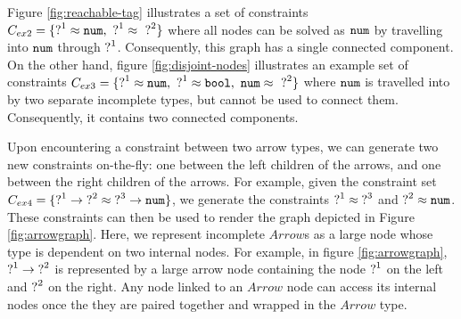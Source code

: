 Figure \ref{fig:reachable-tag} illustrates a set of constraints $C_{ex2} = \{ \mathtt{?}^{1} \approx \mathtt{num}, ~ \mathtt{?}^{1} \approx~ \mathtt{?}^{2}\}$ where all nodes can be solved as $\mathtt{num}$ by travelling into $\mathtt{num}$ through $\mathtt{?}^1$. Consequently, this graph has a single connected component. On the other hand, figure  \ref{fig:disjoint-nodes} illustrates an example set of constraints $C_{ex3} = \{ \mathtt{?}^1 \approx \mathtt{num}, ~ \mathtt{?}^1 \approx \mathtt{bool}, ~ \mathtt{num} \approx~ \mathtt{?}^2\}$ where $\mathtt{num}$ is travelled into by two separate incomplete types, but cannot be used to connect them. Consequently, it contains two connected components.


Upon encountering a constraint between two arrow types, we can generate two new constraints on-the-fly: one between the left children of the arrows, and one between the right children of the arrows. For example, given the constraint set $C_{ex4} = \{ \mathtt{?}^1 \rightarrow \mathtt{?}^2 \approx \mathtt{?}^3 \rightarrow \mathtt{num} \}$, we generate the constraints $\mathtt{?}^1 \approx \mathtt{?}^3$ and $\mathtt{?}^2 \approx \mathtt{num}$. These constraints can then be used to render the graph depicted in Figure \ref{fig:arrowgraph}. Here, we represent incomplete $Arrow$s as a large node whose type is dependent on two internal nodes. For example, in figure \ref{fig:arrowgraph}, $\mathtt{?}^1 \rightarrow \mathtt{?}^2$ is represented by a large arrow node containing the node $\mathtt{?}^1$ on the left and $\mathtt{?}^2$ on the right. Any node linked to an $Arrow$ node can access its internal nodes once the they are paired together and wrapped in the $Arrow$ type. 

